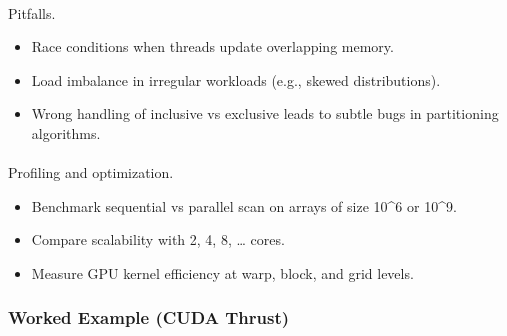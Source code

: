 \documentclass[
  letterpaper,
  DIV=11,
  numbers=noendperiod]{scrreprt}
\makeatletter
\let\oldparagraph\paragraph
\renewcommand{\paragraph}{
    \@ifstar
      \xxxParagraphStar
      \xxxParagraphNoStar
  }
\newcommand{\xxxParagraphStar}[1]{\oldparagraph*{#1}\mbox{}}
\newcommand{\xxxParagraphNoStar}[1]{\oldparagraph{#1}\mbox{}}
\providecommand{\tightlist}{%
  \setlength{\itemsep}{0pt}\setlength{\parskip}{0pt}}
\makeatother
\begin{document}
\paragraph{Pitfalls.}\label{pitfalls.-5}

\begin{itemize}
\tightlist
\item
  Race conditions when threads update overlapping memory.
\item
  Load imbalance in irregular workloads (e.g., skewed distributions).
\item
  Wrong handling of inclusive vs exclusive leads to subtle bugs in
  partitioning algorithms.
\end{itemize}

\paragraph{Profiling and
optimization.}\label{profiling-and-optimization.}

\begin{itemize}
\tightlist
\item
  Benchmark sequential vs parallel scan on arrays of size 10\^{}6 or
  10\^{}9.
\item
  Compare scalability with 2, 4, 8, \ldots{} cores.
\item
  Measure GPU kernel efficiency at warp, block, and grid levels.
\end{itemize}

\subsubsection{Worked Example (CUDA
Thrust)}\label{worked-example-cuda-thrust}
\end{document}
